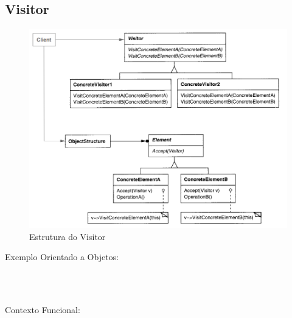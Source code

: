 \subsection{Visitor}

\begin{figure}[htb]
	\caption{\label{fig_grafico}Estrutura do Visitor}
	\begin{center}
	    \includegraphics[scale=0.5]{5_padroes-contexto-funcional/5.3_comportamentais/5.3.11_visitor/diagram.png}
	\end{center}
\end{figure}

Exemplo Orientado a Objetos:

\begin{lstlisting}[caption={Visitor Orientação a Objetos},label=oovisitor]



\end{lstlisting}

Contexto Funcional:


\begin{lstlisting}[caption={Visitor Funcional},label=fpvisitor]
    

    
\end{lstlisting}